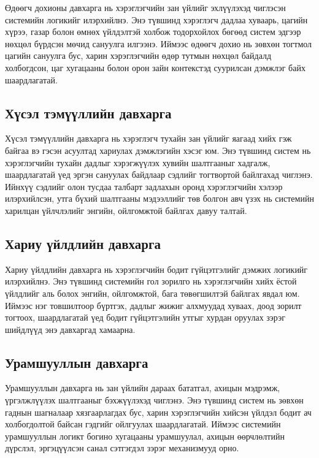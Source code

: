 Өдөөгч дохионы давхарга нь хэрэглэгчийн зан үйлийг эхлүүлэхэд чиглэсэн системийн логикийг илэрхийлнэ. Энэ түвшинд хэрэглэгч дадлаа хуваарь, цагийн хүрээ, газар болон өмнөх үйлдэлтэй холбож тодорхойлох бөгөөд систем эдгээр нөхцөл бүрдсэн мөчид сануулга илгээнэ. Иймээс өдөөгч дохио нь зөвхөн тогтмол цагийн сануулга бус, харин хэрэглэгчийн өдөр тутмын нөхцөл байдалд холбогдсон, цаг хугацааны болон орон зайн контекстэд суурилсан дэмжлэг байх шаардлагатай.

\subsection{Хүсэл тэмүүллийн давхарга}

Хүсэл тэмүүллийн давхарга нь хэрэглэгч тухайн зан үйлийг яагаад хийх гэж байгаа вэ гэсэн асуултад хариулах дэмжлэгийн хэсэг юм. Энэ түвшинд систем нь хэрэглэгчийн тухайн дадлыг хэрэгжүүлэх хувийн шалтгааныг хадгалж, шаардлагатай үед эргэн сануулах байдлаар сэдлийг тогтвортой байлгахад чиглэнэ. Ийнхүү сэдлийг олон тусдаа талбарт задлахын оронд хэрэглэгчийн хэлээр илэрхийлсэн, утга бүхий шалтгааны мэдээллийг төв болгон авч үзэх нь системийн харилцан үйлчлэлийг энгийн, ойлгомжтой байлгах давуу талтай.

\subsection{Хариу үйлдлийн давхарга}

Хариу үйлдлийн давхарга нь хэрэглэгчийн бодит гүйцэтгэлийг дэмжих логикийг илэрхийлнэ. Энэ түвшинд системийн гол зорилго нь хэрэглэгчийн хийх ёстой үйлдлийг аль болох энгийн, ойлгомжтой, бага төвөгшилтэй байлгах явдал юм. Иймээс нэг товшилтоор бүртгэх, дадлыг жижиг алхмуудад хуваах, доод зорилт тогтоох, шаардлагатай үед бодит гүйцэтгэлийн утгыг хурдан оруулах зэрэг шийдлүүд энэ давхаргад хамаарна.
\subsection{Урамшууллын давхарга}

Урамшууллын давхарга нь зан үйлийн дараах бататгал, ахицын мэдрэмж, үргэлжлүүлэх шалтгааныг бэхжүүлэхэд чиглэнэ. Энэ түвшинд систем нь зөвхөн гаднын шагналаар хязгаарлагдах бус, харин хэрэглэгчийн хийсэн үйлдэл бодит ач холбогдолтой байсан гэдгийг ойлгуулах шаардлагатай. Иймээс системийн урамшууллын логикт богино хугацааны урамшуулал, ахицын өөрчлөлтийн дүрслэл, эргэцүүлсэн санал сэтгэгдэл зэрэг механизмууд орно.

